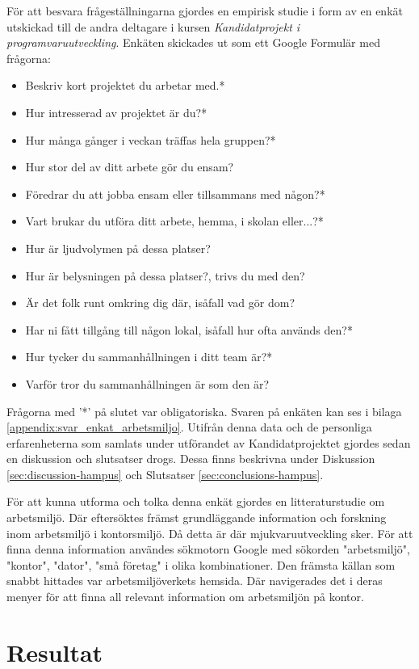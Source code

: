 För att besvara frågeställningarna gjordes en empirisk studie i form av en enkät utskickad till de andra deltagare i kursen \textit{Kandidatprojekt i programvaruutveckling}. Enkäten skickades ut som ett Google Formulär \cite{GForms} med frågorna:
\begin{itemize}
\item Beskriv kort projektet du arbetar med.*
\item Hur intresserad av projektet är du?*
\item Hur många gånger i veckan träffas hela gruppen?*
\item Hur stor del av ditt arbete gör du ensam?
\item Föredrar du att jobba ensam eller tillsammans med någon?*
\item Vart brukar du utföra ditt arbete, hemma, i skolan eller...?*
\item Hur är ljudvolymen på dessa platser?
\item Hur är belysningen på dessa platser?, trivs du med den?
\item Är det folk runt omkring dig där, isåfall vad gör dom?
\item Har ni fått tillgång till någon lokal, isåfall hur ofta används den?*
\item Hur tycker du sammanhållningen i ditt team är?*
\item Varför tror du sammanhållningen är som den är?
\end{itemize}
Frågorna med '*' på slutet var obligatoriska. Svaren på enkäten kan ses i bilaga \ref{appendix:svar_enkat_arbetsmiljo}. Utifrån denna data och de personliga erfarenheterna som samlats under utförandet av Kandidatprojektet gjordes sedan en diskussion och slutsatser drogs. Dessa finns beskrivna under Diskussion \ref{sec:discussion-hampus} och Slutsatser \ref{sec:conclusions-hampus}.

För att kunna utforma och tolka denna enkät gjordes en litteraturstudie om arbetsmiljö. Där eftersöktes främst grundläggande information och forskning inom arbetsmiljö i kontorsmiljö. Då detta är där mjukvaruutveckling sker. För att finna denna information användes sökmotorn Google med sökorden "arbetsmiljö", "kontor", "dator", "små företag" i olika kombinationer. Den främsta källan som snabbt hittades var arbetsmiljöverkets hemsida. Där navigerades det i deras menyer för att finna all relevant information om arbetsmiljön på kontor. 

\section{Resultat}
\label{sec:results-hampus}

